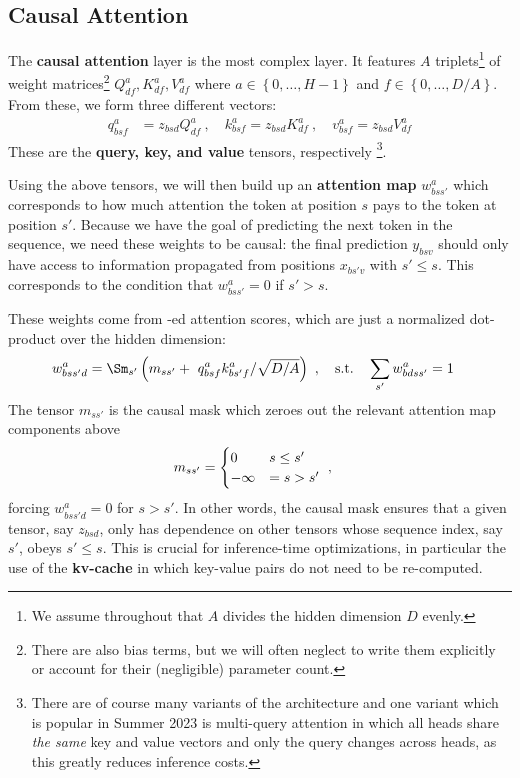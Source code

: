 \documentclass[11pt]{article}
\begin{document}
\subsection{Causal Attention \label{subsubsec_attn_layer} }

The \textbf{causal attention} layer is the most complex layer. It features $ A $  triplets\footnote{
	We assume throughout that $ A $ divides the hidden dimension $ D $ evenly.} of weight
matrices\footnote{There are also bias terms, but we will often neglect to write them explicitly or
	account for their (negligible)
	parameter count.}  $ Q ^{ a } _{ d f }, K ^{ a } _{ df }, V ^{ a } _{ df }  $
where $ a \in \left \{ 0, \ldots, H-1 \right \} $ and $ f \in \left \{ 0, \ldots, D/A \right \} $.
From these, we form three different vectors:
\begin{align}
	q ^{ a }_{ bsf } & = z _{ bsd } Q ^{ a }_{ df } \ , \quad
	k ^{ a }_{ bsf } = z _{ bsd } K ^{ a }_{ df }  \ , \quad
	v ^{ a }_{ bsf } = z _{ bsd } V ^{ a }_{ df }
\end{align}
These are the \textbf{query, key, and value} tensors, respectively \footnote{There are of course
	many variants of the architecture and one variant which is popular in Summer 2023 is multi-query
	attention \cite{shazeer2019fast} in which all heads share \textit{the same} key and value vectors
	and only the query changes across heads, as this greatly reduces inference costs.}.

Using the above tensors, we will then build up an \textbf{attention map}  $ w ^{ a }_{ bss' } $
which corresponds to how much attention the token at position $ s $ pays to the token at
position $ s' $.  Because we have the goal of predicting the
next token in the sequence, we need these weights to be causal: the final prediction $ y _{ bsv } $
should only have access to information propagated from positions $ x _{ bs'v } $ with $ s' \le s $.
This corresponds to the condition that $ w ^{ a }_{ bss' } = 0  $ if  $ s' > s  $.

These weights come from -ed attention scores, which are just a normalized
dot-product over the hidden dimension:
\begin{align}
	w ^{ a }_{ bss'd } & =\Sm _{ s' } \left (m _{ s s' }+\ q ^{ a }_{ bsf }k ^{ a }_{ bs'f } / \sqrt{D/A} \right
	)\ ,  \quad {\rm s.t.} \quad \sum_{s'}w ^{ a }_{ bdss' } =1
\end{align}
The tensor $ m _{  s s' } $ is the causal mask which zeroes out the relevant attention map
components above
\begin{align}
	m _{ s s' } & = \begin{cases}
		                0       & s \le s' \nonumber\\
		                -\infty & = s > s'
	                \end{cases}\ ,
\end{align}
forcing $ w ^{ a  } _{ bss'd } =0$ for $ s> s' $. In other words, the causal mask ensures that a
given tensor, say $ z _{ bsd } $, only has dependence on other tensors whose sequence index, say $
	s' $, obeys $ s' \le s $.  This is crucial for inference-time optimizations, in particular the use
of the \textbf{kv-cache} in which key-value pairs do not need to be re-computed.
\end{document}
